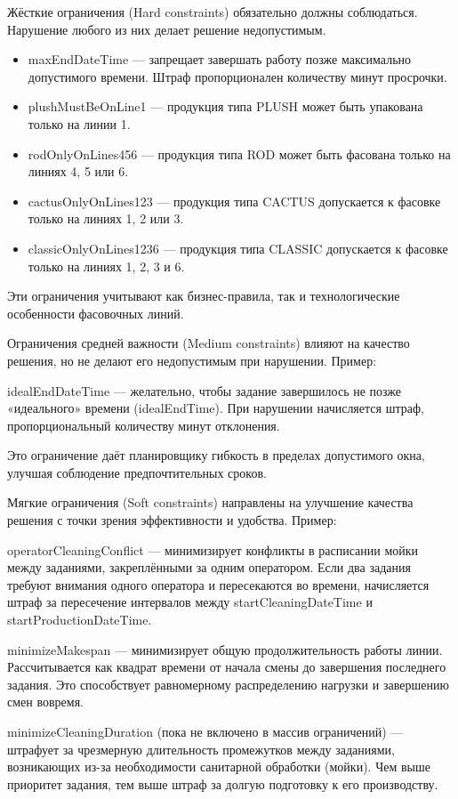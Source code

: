 Жёсткие ограничения (Hard constraints) обязательно должны соблюдаться. Нарушение любого из них делает решение недопустимым.

\begin{itemize}
    \item maxEndDateTime — запрещает завершать работу позже максимально допустимого времени. Штраф пропорционален количеству минут просрочки.
    \item plushMustBeOnLine1 — продукция типа PLUSH может быть упакована только на линии 1.
    \item rodOnlyOnLines456 — продукция типа ROD может быть фасована только на линиях 4, 5 или 6.
    \item cactusOnlyOnLines123 — продукция типа CACTUS допускается к фасовке только на линиях 1, 2 или 3.
    \item classicOnlyOnLines1236 — продукция типа CLASSIC допускается к фасовке только на линиях 1, 2, 3 и 6.
\end{itemize}

Эти ограничения учитывают как бизнес-правила, так и технологические особенности фасовочных линий.

Ограничения средней важности (Medium constraints) влияют на качество решения, но не делают его недопустимым при нарушении. Пример:

idealEndDateTime — желательно, чтобы задание завершилось не позже «идеального» времени (idealEndTime). При нарушении начисляется штраф, пропорциональный количеству минут отклонения.

Это ограничение даёт планировщику гибкость в пределах допустимого окна, улучшая соблюдение предпочтительных сроков.

 Мягкие ограничения (Soft constraints) направлены на улучшение качества решения с точки зрения эффективности и удобства. Пример:

 operatorCleaningConflict — минимизирует конфликты в расписании мойки между заданиями, закреплёнными за одним оператором. Если два задания требуют внимания одного оператора и пересекаются во времени, начисляется штраф за пересечение интервалов между startCleaningDateTime и startProductionDateTime.

 minimizeMakespan — минимизирует общую продолжительность работы линии. Рассчитывается как квадрат времени от начала смены до завершения последнего задания. Это способствует равномерному распределению нагрузки и завершению смен вовремя.

 minimizeCleaningDuration (пока не включено в массив ограничений) — штрафует за чрезмерную длительность промежутков между заданиями, возникающих из-за необходимости санитарной обработки (мойки). Чем выше приоритет задания, тем выше штраф за долгую подготовку к его производству.

